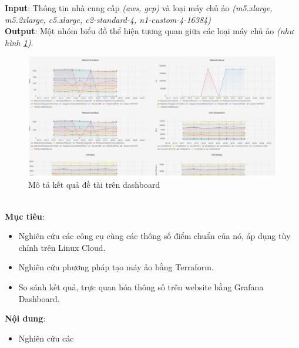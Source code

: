 \documentclass{article}
\begin{document}
\textbf{Input}: Thông tin nhà cung cấp \textit{(aws, gcp)} và loại máy chủ ảo \textit{(m5.xlarge, m5.2xlarge, c5.xlarge, c2-standard-4, n1-custom-4-16384)}\\

\textbf{Output}: Một nhóm biểu đồ thể hiện tương quan giữa các loại máy chủ ảo \textit{(như hình \ref{fig:grafana-dashboard})}.
\begin{figure}[h!]
  \centering
  \includegraphics[scale=0.3]{imgs/grafana-dashboard.png}
  \caption{Mô tả kết quả đề tài trên dashboard}
  \label{fig:grafana-dashboard}
\end{figure} \\

\textbf{Mục tiêu}:
\begin{itemize}
  \item Nghiên cứu các công cụ \cite{Passmark2023Performancetest, Axboe2023fio, Iozone2016Benchmark, OOKLA2023Speedtest} cùng các thông số điểm chuẩn của nó, áp dụng tùy chỉnh trên Linux Cloud.
  \item Nghiên cứu phương pháp tạo máy ảo bằng Terraform\cite{zadka2022terraform}.
  \item So sánh kết quả, trực quan hóa thông số trên website bằng Grafana Dashboard.
\end{itemize} 

\textbf{Nội dung}:
\begin{itemize}
  \item Nghiên cứu các
\end{itemize}
\newpage
\printbibliography[heading=bibintoc, title = {TÀI LIỆU THAM KHẢO}]
\end{document}
